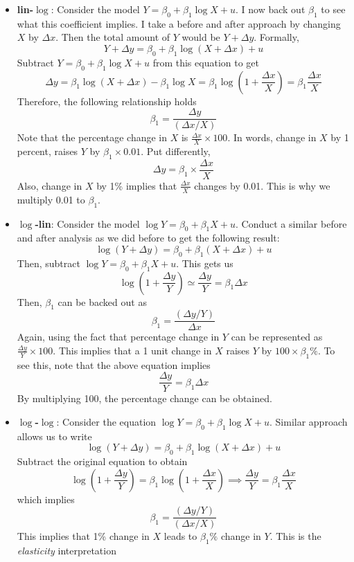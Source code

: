 \begin{itemize}
\item\textbf{lin-$\log$}:  Consider the model $Y=\beta_0 + \beta_1 \log{X}+u$. I now back out $\beta_1$ to see what this coefficient implies. I take a before and after approach by changing $X$ by $\Delta x$. Then the total amount of $Y$ would be $Y+\Delta y$. Formally, 
\[
Y+\Delta y = \beta_0 + \beta_1 \log(X+\Delta x)+u
\]
Subtract $Y=\beta_0 + \beta_1 \log{X}+u$ from this equation to get
\[
\Delta y = \beta_1 \log(X+\Delta x)-\beta_1\log{X} = \beta_1 \log\left(1+\frac{\Delta x}{X} \right) = \beta_1 \frac{\Delta x}{X}
\]
Therefore, the following relationship holds
\[
\beta_1 = \frac{\Delta y}{(\Delta x/X)}
\]
Note that the percentage change in $X$ is $\frac{\Delta x}{X} \times 100$. In words, change in $X$ by 1 percent, raises $Y$ by $\beta_1 \times 0.01$. Put differently, 
\[
\Delta y = \beta_1 \times \frac{\Delta x}{X}
\]
Also, change in $X$ by 1\% implies that $\frac{\Delta x}{X}$ changes by 0.01. This is why we multiply 0.01 to $\beta_1$. 
\item\textbf{$\log$-lin}: Consider the model $\log{Y}=\beta_0 + \beta_1 X+u$. Conduct a similar before and after analysis as we did before to get the following result:
\[
\log(Y+\Delta y) = \beta_0 + \beta_1(X+\Delta x)+u
\]
Then, subtract $\log{Y}=\beta_0 + \beta_1 X+u$. This gets us
\[
\log\left(1+\frac{\Delta y}{Y}\right)\simeq \frac{\Delta y}{Y} = \beta_1 \Delta x
\]
Then, $\beta_1$ can be backed out as
\[
\beta_1 = \frac{(\Delta y / Y)}{\Delta x}
\]
Again, using the fact that percentage change in $Y$ can be represented as $\frac{\Delta y}{Y}\times 100$. This implies that a 1 unit change in $X$ raises $Y$ by $100\times \beta_1\%$. To see this, note that the above equation implies
\[
\frac{\Delta y}{Y} = \beta_1 \Delta x
\] 
By multiplying 100, the percentage change can be obtained. 
\item\textbf{$\log$-$\log$}: Consider the equation $\log{Y} = \beta_0 + \beta_1\log{X}+u$. Similar approach allows us to write
\[
\log(Y+\Delta y) = \beta_0 + \beta_1 \log(X+\Delta x)+u
\]
Subtract the original equation to obtain
\[
\log\left(1+\frac{\Delta y}{Y}\right)=\beta_1\log\left(1+\frac{\Delta x}{X}\right) \implies \frac{\Delta y}{Y}=\beta_1\frac{\Delta x}{X}
\]
which implies 
\[
\beta_1 = \frac{(\Delta y/Y)}{(\Delta x/X)}
\]
This implies that 1\% change in $X$ leads to $\beta_1\%$ change in $Y$. This is the \textit{elasticity} interpretation
\end{itemize}
